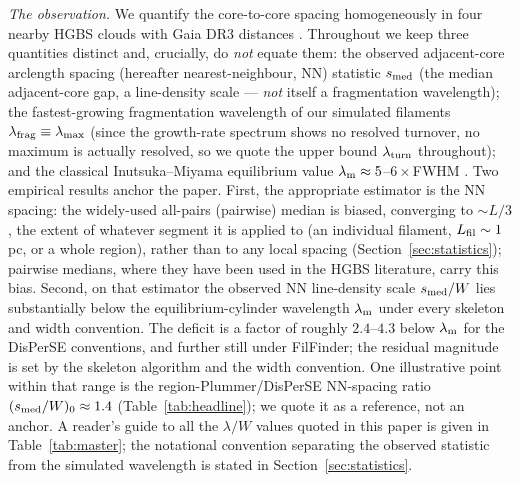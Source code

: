 \documentclass[usenatbib,twoside,twocolumn]{mnras}
\begin{document}
\emph{The observation.} We quantify the core-to-core spacing homogeneously in four nearby HGBS clouds with Gaia DR3 distances \citep{Zhang2023}. Throughout we keep three quantities distinct and, crucially, do \emph{not} equate them: the observed adjacent-core arclength spacing (hereafter nearest-neighbour, NN) statistic $s_{\rm med}$ (the median adjacent-core gap, a line-density scale --- \emph{not} itself a fragmentation wavelength); the fastest-growing fragmentation wavelength of our simulated filaments $\lambda_{\rm frag}\equiv\lambda_{\rm max}$ (since the growth-rate spectrum shows no resolved turnover, no maximum is actually resolved, so we quote the upper bound $\lambda_{\rm turn}$ throughout); and the classical Inutsuka--Miyama equilibrium value $\lambda_{\rm m}\approx5$--$6\times$FWHM \citep{Inutsuka1992,Fischera2012}. Two empirical results anchor the paper. First, the appropriate estimator is the NN spacing: the widely-used all-pairs (pairwise) median is biased, converging to $\sim L/3$, the extent of whatever segment it is applied to (an individual filament, $L_{\rm fil}\sim1$\,pc, or a whole region), rather than to any local spacing (Section~\ref{sec:statistics}); pairwise medians, where they have been used in the HGBS literature, carry this bias. Second, on that estimator the observed NN line-density scale $s_{\rm med}/W$ lies substantially below the equilibrium-cylinder wavelength $\lambda_{\rm m}$ under every skeleton and width convention. The deficit is a factor of roughly $2.4$--$4.3$ below $\lambda_{\rm m}$ for the DisPerSE conventions, and further still under FilFinder; the residual magnitude is set by the skeleton algorithm and the width convention. One illustrative point within that range is the region-Plummer/DisPerSE NN-spacing ratio $(s_{\rm med}/W)_0\approx1.4$ (Table~\ref{tab:headline}); we quote it as a reference, not an anchor. A reader's guide to all the $\lambda/W$ values quoted in this paper is given in Table~\ref{tab:master}; the notational convention separating the observed statistic from the simulated wavelength is stated in Section~\ref{sec:statistics}.
\end{document}
